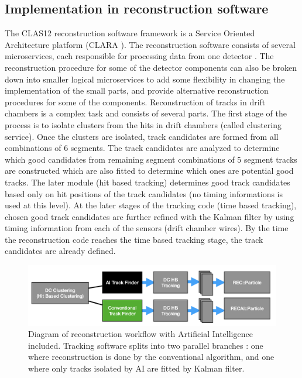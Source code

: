 \subsection{Implementation in reconstruction software}

The CLAS12 reconstruction software framework is a Service Oriented Architecture platform (CLARA \cite{Gyurjyan:2011zz}).
The reconstruction software consists of several microservices, each responsible for processing data from one
detector \cite{Ziegler:2020gsr}. The reconstruction procedure for some of the detector components can also 
be broken down into smaller logical microservices to add some flexibility in changing the implementation of the small parts, 
and provide alternative reconstruction procedures for some of the components.
Reconstruction of tracks in drift chambers is a complex task and consists of several parts.
The first stage of the process is to isolate clusters
from the hits in drift chambers (called clustering service). Once the clusters are isolated, track candidates are formed from all combinations 
of 6 segments. The track candidates are analyzed to determine which good candidates from remaining segment 
combinations of 5 segment tracks are constructed which are also fitted to determine which ones are potential good tracks.
The later module (hit based tracking) determines good track candidates based only on hit positions of the track candidates (no timing
informations is used at this level). At the later stages of the tracking code (time based tracking), chosen good track candidates are further refined with the Kalman filter by using timing information from each of the sensors (drift chamber wires). By the time the reconstruction code reaches the time based tracking stage, the track candidates are already defined. 

\begin{figure}[!ht]
\begin{center}
 \includegraphics[width=6.0in]{images/recon_diagram.png}
\caption {Diagram of reconstruction workflow with Artificial Intelligence included. Tracking software splits into two parallel branches : one where reconstruction is done by the conventional algorithm, and one where only tracks isolated by AI are fitted by Kalman filter.}
 \label{recon:diagram}
 \end{center}
\end{figure}

